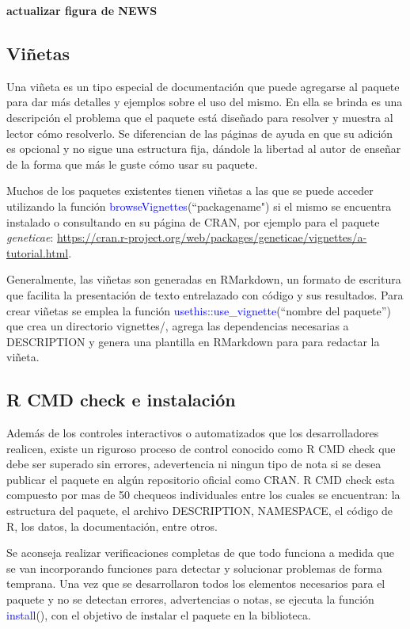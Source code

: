 \textbf{actualizar figura de NEWS}


\subsection{Viñetas}

Una viñeta es un tipo especial de documentación que puede agregarse al paquete para dar más detalles y ejemplos sobre el uso del mismo. En ella se brinda es una descripción el problema que el paquete está diseñado para resolver y muestra al lector cómo resolverlo. Se diferencian de las páginas de ayuda en que su adición es opcional y no sigue una estructura fija, dándole la libertad al autor de enseñar de la forma que más le guste cómo usar su paquete. 


Muchos de los paquetes existentes tienen viñetas a las que se puede acceder utilizando la función \textcolor{blue}{browseVignettes}(``packagename") si el mismo se encuentra instalado o consultando en su página de CRAN, por ejemplo para el paquete \emph{geneticae}: \url{https://cran.r-project.org/web/packages/geneticae/vignettes/a-tutorial.html}.

Generalmente, las viñetas son generadas en RMarkdown, un formato de escritura que facilita la presentación de texto entrelazado con código y sus resultados. Para crear viñetas se emplea la función \textcolor{blue}{usethis::use\_vignette}(``nombre del paquete'') que crea un directorio vignettes/, agrega las dependencias necesarias a DESCRIPTION y genera una plantilla en RMarkdown para para redactar la viñeta. 


\subsection{R CMD check e instalación}
Además de los controles interactivos o automatizados que los desarrolladores realicen, existe un riguroso proceso de control conocido como R CMD check que debe ser superado sin errores, adevertencia ni ningun tipo de nota si se desea publicar el paquete en algún repositorio oficial como CRAN. R CMD check esta compuesto por mas de 50 chequeos individuales entre los cuales se encuentran: la estructura del paquete, el archivo DESCRIPTION, NAMESPACE, el código de R, los datos, la documentación, entre otros.  

Se aconseja realizar verificaciones completas de que todo funciona a medida que se van incorporando funciones para detectar y solucionar problemas de forma temprana.  Una vez que se desarrollaron todos los elementos necesarios para el paquete y no se detectan errores, advertencias o notas, se ejecuta la función \textcolor{blue}{install}(), con el objetivo de instalar el paquete en la biblioteca.


